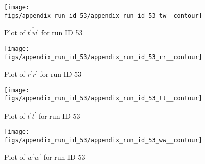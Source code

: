 \begin{figure}[H]
\centering
\texttt{[image: figs/appendix\_run\_id\_53/appendix\_run\_id\_53\_tw\_\_contour]}
\caption{Plot of $\overline{t^\prime w^\prime}$ for run ID 53}
\label{fig:appendix_run_id_53_tw__contour}
\end{figure}


\begin{figure}[H]
\centering
\texttt{[image: figs/appendix\_run\_id\_53/appendix\_run\_id\_53\_rr\_\_contour]}
\caption{Plot of $\overline{r^\prime r^\prime}$ for run ID 53}
\label{fig:appendix_run_id_53_rr__contour}
\end{figure}


\begin{figure}[H]
\centering
\texttt{[image: figs/appendix\_run\_id\_53/appendix\_run\_id\_53\_tt\_\_contour]}
\caption{Plot of $\overline{t^\prime t^\prime}$ for run ID 53}
\label{fig:appendix_run_id_53_tt__contour}
\end{figure}


\begin{figure}[H]
\centering
\texttt{[image: figs/appendix\_run\_id\_53/appendix\_run\_id\_53\_ww\_\_contour]}
\caption{Plot of $\overline{w^\prime w^\prime}$ for run ID 53}
\label{fig:appendix_run_id_53_ww__contour}
\end{figure}



